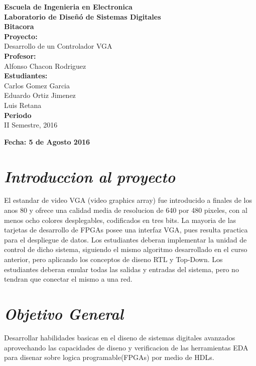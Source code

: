 \documentclass[12pt,a4paper]{report}
\begin{document}
\begin{titlepage}
\begin{center}
\vspace*{1.5cm}
\textbf{Escuela de Ingenieria en Electronica}\\[0.8cm]
\textbf{Laboratorio de Diseñó de Sistemas Digitales}\\[1cm]
\textbf{Bitacora}\\[2cm]
\textbf{Proyecto:}\\[0.4cm]
Desarrollo de un Controlador VGA \\[1.7cm]
\textbf{Profesor:}\\[0.4cm]
Alfonso Chacon Rodriguez \\[1.7cm]
\textbf{Estudiantes:}\\[0.4cm]
Carlos Gomez Garcia\\[0.8cm]
Eduardo Ortiz Jimenez \\[0.8cm]
Luis Retana\\[1.7cm]
\textbf{Periodo}\\[0.8cm]
II Semestre, 2016\\
\end{center}
\end{titlepage}

\begin{flushright}
\begin{large}
\textbf{Fecha: 5 de Agosto 2016}\\
\end{large}
\end{flushright}

\section*{\textit{Introduccion al proyecto}}
El estandar de video VGA (video graphics array) fue introducido a finales de los anos 80 y ofrece
una calidad media de resolucion de 640 por 480 pixeles, con al menos ocho colores desplegables,
codificados en tres bits. La mayoria de las tarjetas de desarrollo de FPGAs posee una interfaz VGA,
pues resulta practica para el despliegue de datos.
Los estudiantes deberan implementar la unidad de control de dicho sistema, siguiendo el mismo
algoritmo desarrollado en el curso anterior, pero aplicando los conceptos de diseno RTL y Top-Down.
Los estudiantes deberan emular todas las salidas y entradas del sistema, pero no tendran que conectar el mismo a una red.

\section*{\textit{Objetivo General}}
Desarrollar habilidades basicas en el diseno de sistemas digitales avanzados aprovechando las 
capacidades de diseno y verificacion de las herramientas EDA para disenar sobre logica programable(FPGAs) por medio de HDLs.
\end{document}
